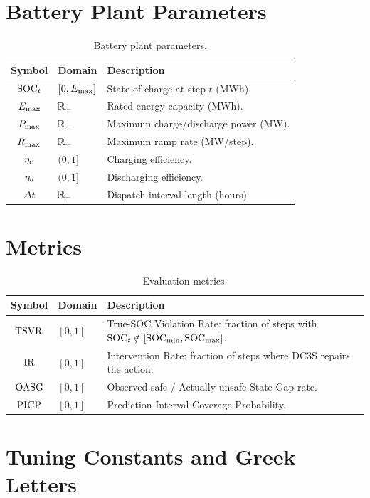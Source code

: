 \section{Battery Plant Parameters}

\begin{longtable}{@{}clp{8.2cm}@{}}
\caption{Battery plant parameters.}\label{tab:notation-battery}\\
\toprule
\textbf{Symbol} & \textbf{Domain} & \textbf{Description} \\
\midrule
\endfirsthead
\bottomrule
\endfoot
$\mathrm{SOC}_t$   & $[0, E_{\max}]$  & State of charge at step $t$ (MWh). \\
$E_{\max}$    & $\mathbb{R}_+$        & Rated energy capacity (MWh). \\
$P_{\max}$    & $\mathbb{R}_+$        & Maximum charge/discharge power (MW). \\
$R_{\max}$    & $\mathbb{R}_+$        & Maximum ramp rate (MW/step). \\
$\eta_c$    & $(0,1]$       & Charging efficiency. \\
$\eta_d$    & $(0,1]$       & Discharging efficiency. \\
$\Delta t$ & $\mathbb{R}_+$        & Dispatch interval length (hours). \\
\end{longtable}

\section{Metrics}

\begin{longtable}{@{}clp{8.2cm}@{}}
\caption{Evaluation metrics.}\label{tab:notation-metrics}\\
\toprule
\textbf{Symbol} & \textbf{Domain} & \textbf{Description} \\
\midrule
\endfirsthead
\bottomrule
\endfoot
$\mathrm{TSVR}$ & $[0,1]$ & True-SOC Violation Rate: fraction of steps with $\mathrm{SOC}_t \notin [\mathrm{SOC}_{\min}, \mathrm{SOC}_{\max}]$. \\
$\mathrm{IR}$    & $[0,1]$ & Intervention Rate: fraction of steps where DC3S repairs the action. \\
$\mathrm{OASG}$ & $[0,1]$ & Observed-safe / Actually-unsafe State Gap rate. \\
$\mathrm{PICP}$ & $[0,1]$ & Prediction-Interval Coverage Probability. \\
\end{longtable}

\section{Tuning Constants and Greek Letters}

